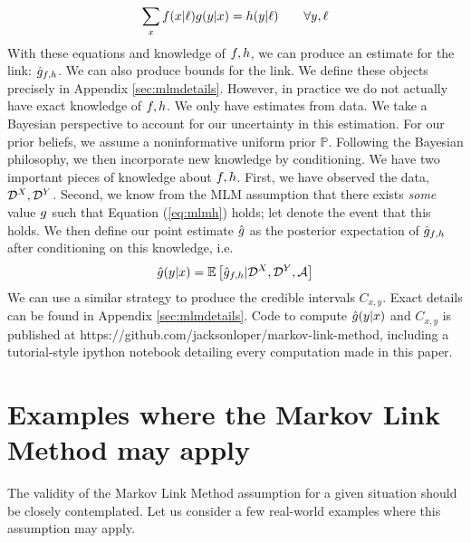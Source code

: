 \begin{gather}\label{eq:mlmh}
\sum_x f(x|\ell)g(y|x)=h(y|\ell) \qquad \forall y,\ell
\end{gather}
With these equations and knowledge of $f,h$, we can produce an estimate for the link: $\hat {g}_{f,h}$.  We can also produce bounds for the link.  We define these objects precisely in Appendix \ref{sec:mlmdetails}.  However, in practice we do not actually have exact knowledge of $f,h$.  We only have estimates from data.  We take a Bayesian perspective to account for our uncertainty in this estimation.  For our prior beliefs, we assume a noninformative uniform prior $\mathbb{P}$.  Following the Bayesian philosophy, we then incorporate new knowledge by conditioning.  We have two important pieces of knowledge about $f,h$.  First, we have observed the data, $\mathcal{D}^X,\mathcal{D}^Y$.  Second, we know from the MLM assumption that there exists \emph{some} value $g$ such that Equation (\ref{eq:mlmh}) holds; let \MLMH{} denote the event that this holds.  We then define our point estimate $\hat {g}$ as the posterior expectation of $\hat {g}_{f,h}$ after conditioning on this knowledge, i.e.
\[
\hat {g}(y|x) = \mathbb{E}\left[\hat {g}_{f,h} | \mathcal{D}^X,\mathcal{D}^Y,\mathcal{A} \right]
\]
We can use a similar strategy to produce the credible intervals $C_{x,y}$.  Exact details can be found in Appendix \ref{sec:mlmdetails}.  Code to compute $\hat {g}(y|x)$ and $C_{x,y}$ is published at https://github.com/jacksonloper/markov-link-method, including a tutorial-style ipython notebook detailing every computation made in this paper.


\section{Examples where the Markov Link Method may apply}

\label{sec:examples}

The validity of the Markov Link Method assumption for a given situation should be closely contemplated.  Let us consider a few real-world examples where this assumption may apply.

